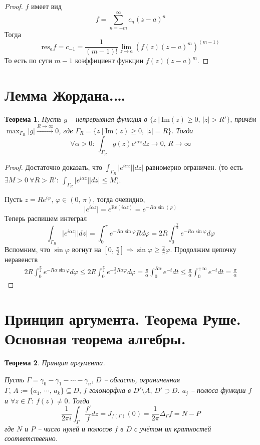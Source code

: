 \documentclass[a4paper,12pt]{article}
\renewcommand{\phi}{\ensuremath{\varphi}}
\renewcommand{\leq}{\ensuremath{\leqslant}}
\renewcommand{\geq}{\ensuremath{\geqslant}}
\theoremstyle{plain}
\newtheorem{theorem}{Теорема}[section]
\theoremstyle{definition}
\theoremstyle{remark}
\begin{document}
\begin{proof}
	$f$ имеет вид
	\[
		f = \sum_{n = -m}^\infty c_{n}(z - a)^n
	\]
	Тогда
	\[
		\text{res}_af = c_{-1} = \frac{1}{(m - 1)!}\lim_{z \to a}\left(f(z)(z - a)^m\right)^{(m - 1)}
	\]
	То есть по сути $m - 1$ коэффициент функции $f(z)(z - a)^m$.
\end{proof}

\section{Лемма Жордана.\dots}
\begin{theorem}
	Пусть $g$ -- непрерывная функция в $\{z \:\vert\: \text{Im}(z) \geq 0,\, \vert z\vert > R'\}$, причём $\max_{\Gamma_R}\vert g\vert \overset{R \to \infty}{\to} 0$, где $\Gamma_R = \{z \:\vert\: \text{Im}(z) \geq 0,\, \vert z\vert = R\}$. Тогда
	\[
		\forall \alpha > 0 :\: \int_{\Gamma_R} g(z)e^{i\alpha z}dz \to 0,\, R \to \infty
	\]
\end{theorem}

\begin{proof}
	Достаточно доказать, что $\int_{\Gamma_R}\vert e^{i\alpha z}\vert\vert dz\vert$ равномерно ограничен. (то есть $\exists M > 0 \: \forall R > R' :\: \int_{\Gamma_R}\vert e^{i\alpha z}\vert\vert dz\vert \leq M$).

	Пусть $z = Re^{i\phi},\, \phi \in (0,\, \pi)$, тогда очевидно,
	\[
		\vert e^{i\alpha z}\vert = e^{\text{Re}(i\alpha z)} = e^{-R\alpha\sin(\phi)}
	\]
	Теперь распишем интеграл
	\[
		\int_{\Gamma_R}\vert e^{i\alpha z}\vert\vert dz\vert = \int_0^\pi e^{-R\alpha\sin\phi}Rd\phi = 2R\int_0^{\frac{\pi}{2}}e^{-R\alpha\sin\phi}d\phi
	\]
	Вспомним, что $\sin\phi$ вогнут на $[0,\, \frac{\pi}{2}] \Rightarrow \sin\phi \geq \frac{2}{\pi}\phi$. Продолжим цепочку неравенств
	\begin{align*}
		2R\int_0^{\frac{\pi}{2}}e^{-R\alpha\sin\phi}d\phi \leq 2R\int_0^{\frac{\pi}{2}}e^{-\frac{2}{\pi}R\alpha\phi}d\phi = \frac{\pi}{\alpha}\int_0^{R\alpha}e^{-t}dt \leq \frac{\pi}{\alpha}\int_0^{+\infty}e^{-t}dt = \frac{\pi}{\alpha}
	\end{align*}
\end{proof}

\section{Принцип аргумента. Теорема Руше. Основная теорема алгебры.}
\begin{theorem}
	Принцип аргумента.

	Пусть $\Gamma = \gamma_0 - \gamma_1 - \cdots - \gamma_n,\, D$ -- область, ограниченная $\Gamma,\, A := \{a_1,\,\cdots,\, a_k\} \subseteq D,\, f$ голоморфна в $D' \setminus A,\, D' \supset D$. $a_j$ -- полюса функции $f$ и $\forall z \in \Gamma :\: f(z) \neq 0$. Тогда
	\[
		\frac{1}{2\pi i}\int_\Gamma\frac{f'}{f}dz = J_{f(\Gamma)}(0) = \frac{1}{2\pi}\Delta_\Gamma f = N - P
	\]
	где $N$ и $P$ -- число нулей и полюсов $f$ в $D$ с учётом их кратностей соответственно.
\end{theorem}
\end{document}
